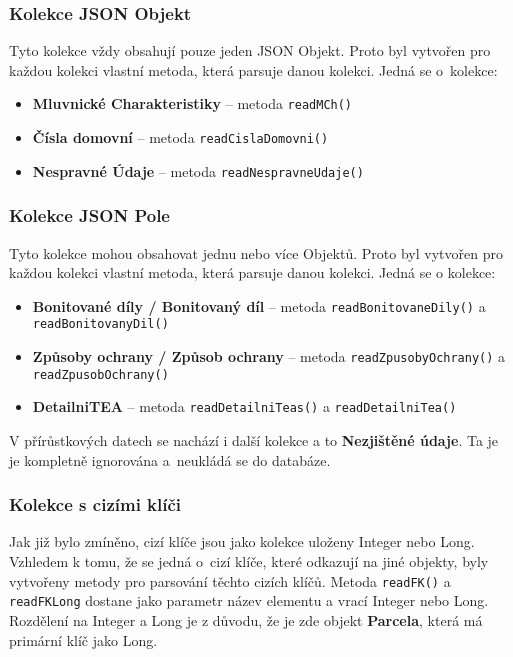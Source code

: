 \subsubsection*{Kolekce JSON Objekt}
Tyto kolekce vždy obsahují pouze jeden JSON Objekt.
Proto byl vytvořen pro každou kolekci vlastní metoda, která parsuje danou kolekci.
Jedná se o~kolekce:
\begin{itemize}
    \item \textbf{Mluvnické Charakteristiky} -- metoda \texttt{readMCh()}
    \item \textbf{Čísla domovní} -- metoda \texttt{readCislaDomovni()}
    \item \textbf{Nespravné Údaje} -- metoda \texttt{readNespravneUdaje()}
\end{itemize}

\subsubsection*{Kolekce JSON Pole}
Tyto kolekce mohou obsahovat jednu nebo více Objektů.
Proto byl vytvořen pro každou kolekci vlastní metoda, která parsuje danou kolekci.
Jedná se o kolekce:
\begin{itemize}
    \item \textbf{Bonitované díly / Bonitovaný díl} -- metoda \texttt{readBonitovaneDily()} a \texttt{readBonitovanyDil()}
    \item \textbf{Způsoby ochrany / Způsob ochrany} -- metoda \texttt{readZpusobyOchrany()} a \texttt{readZpusobOchrany()}
    \item \textbf{DetailniTEA} -- metoda \texttt{readDetailniTeas()} a \texttt{readDetailniTea()}
\end{itemize}

V přírůstkových datech se nachází i další kolekce a to \textbf{Nezjištěné údaje}.
Ta je je kompletně ignorována a~neukládá se do databáze.


\subsubsection*{Kolekce s cizími klíči}
Jak již bylo zmíněno, cizí klíče jsou jako kolekce uloženy Integer nebo Long.
Vzhledem k tomu, že se jedná o~cizí klíče, které odkazují na jiné objekty,
byly vytvořeny metody pro parsování těchto cizích klíčů.
Metoda \texttt{readFK()} a \texttt{readFKLong} dostane jako parametr název elementu a vrací Integer nebo Long.
Rozdělení na Integer a Long je z důvodu, že je zde objekt \textbf{Parcela}, která má primární klíč jako Long.

